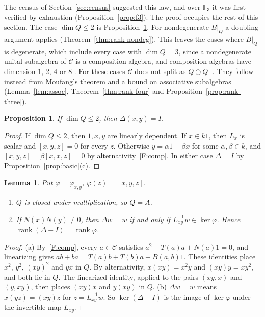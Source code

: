 \documentclass[11pt]{amsart}
\newtheorem{proposition}[theorem]{Proposition}
\newtheorem{lemma}[theorem]{Lemma}
\theoremstyle{definition}
\theoremstyle{remark}
\newcommand{\F}{\mathbb{F}}
\newcommand{\C}{\mathcal{C}}
\newcommand{\assoc}[3]{[#1,#2,#3]}
\DeclareMathOperator{\rank}{rank}
\begin{document}
The census of Section~\ref{sec:census} suggested this law, and over $\F_3$ it
was first verified by exhaustion (Proposition~\ref{prop:f3}). The proof
occupies the rest of this section. The case $\dim Q\le2$ is
Proposition~\ref{prop:flat}. For nondegenerate $B|_Q$ a doubling argument
applies (Theorem~\ref{thm:rank-nondeg}). This leaves the cases where $B|_Q$ is
degenerate, which include every case with $\dim Q=3$, since a nondegenerate
unital subalgebra of $\C$ is a composition algebra, and composition algebras
have dimension $1$, $2$, $4$ or $8$ \cite{hurwitz1898,springer2000}. For
these cases $\C$ does not split as $Q\oplus Q^\perp$. They follow instead from
Moufang's theorem and a bound on associative subalgebras
(Lemma~\ref{lem:assoc}, Theorem~\ref{thm:rank-four} and
Proposition~\ref{prop:rank-three}).

\begin{proposition}\label{prop:flat}
If $\dim Q\le2$, then $\Delta(x,y)=I$.
\end{proposition}

\begin{proof}
If $\dim Q\le2$, then $1,x,y$ are linearly dependent. If $x\in k1$, then $L_x$ is
scalar and $\assoc xyz=0$ for every $z$. Otherwise $y=\alpha1+\beta x$ for some
$\alpha,\beta\in k$, and
$\assoc xyz=\beta\assoc xxz=0$ by alternativity~\ref{F:comp}. In either case
$\Delta=I$ by Proposition~\ref{prop:basic}(c).
\end{proof}

\begin{lemma}\label{lem:phi}
Put $\varphi=\varphi_{x,y}$, $\varphi(z)=\assoc xyz$.
\begin{enumerate}[label=\textup{(\alph*)}]
\item $Q$ is closed under multiplication, so $Q=A$.
\item If $N(x)N(y)\neq0$, then $\Delta w=w$ if and only if
  $L_{xy}^{-1}w\in\ker\varphi$. Hence $\rank(\Delta-I)=\rank\varphi$.
\end{enumerate}
\end{lemma}

\begin{proof}
(a) By~\ref{F:comp}, every $a\in\C$ satisfies $a^2-T(a)a+N(a)1=0$, and
linearizing gives $ab+ba=T(a)b+T(b)a-B(a,b)1$. These identities place $x^2$,
$y^2$, $(xy)^2$ and $yx$ in $Q$. By alternativity, $x(xy)=x^2y$ and
$(xy)y=xy^2$, and both lie in $Q$. The linearized identity, applied to the
pairs $(xy,x)$ and $(y,xy)$, then places $(xy)x$ and $y(xy)$ in $Q$.
(b) $\Delta w=w$ means $x(yz)=(xy)z$ for $z=L_{xy}^{-1}w$. So $\ker(\Delta-I)$ is
the image of $\ker\varphi$ under the invertible map $L_{xy}$.
\end{proof}
\end{document}
